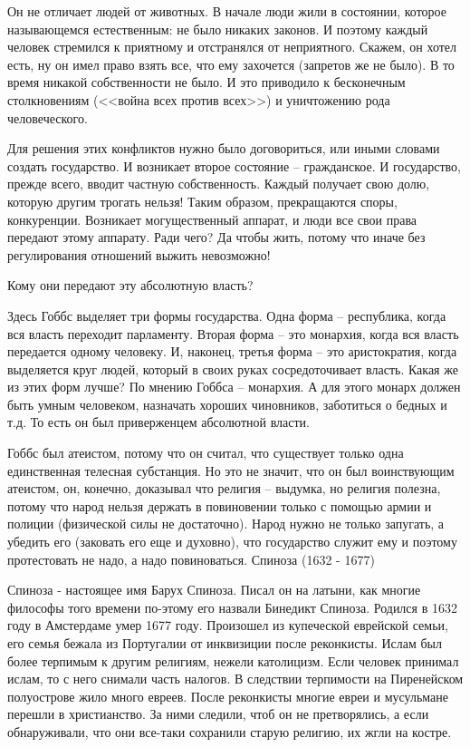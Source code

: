 Он не отличает людей от животных. В начале люди жили в состоянии, которое называющемся естественным: не было никаких законов. И поэтому каждый человек стремился к приятному и отстранялся от неприятного. Скажем, он хотел есть, ну он имел право взять все, что ему захочется (запретов же не было). В то время никакой собственности не было. И это приводило к бесконечным столкновениям (<<война всех против всех>>) и уничтожению рода человеческого.

Для решения этих конфликтов нужно было договориться, или иными словами создать государство. И возникает второе состояние – гражданское. И государство, прежде всего, вводит частную собственность. Каждый получает свою долю, которую другим трогать нельзя! Таким образом, прекращаются споры, конкуренции. Возникает могущественный аппарат, и люди все свои права передают этому аппарату. Ради чего? Да чтобы жить, потому что иначе без регулирования отношений выжить невозможно!

Кому они передают эту абсолютную власть?

    Здесь Гоббс выделяет три формы государства. Одна форма – республика, когда вся власть переходит парламенту. Вторая форма – это монархия, когда вся власть передается одному человеку. И, наконец, третья форма – это аристократия, когда выделяется круг людей, который в своих руках сосредоточивает власть. Какая же из этих форм лучше? По мнению Гоббса – монархия. А для этого монарх должен быть умным человеком, назначать хороших чиновников, заботиться о бедных и т.д. То есть он был приверженцем абсолютной власти.

Гоббс был атеистом, потому что он считал, что существует только одна единственная телесная субстанция. Но это не значит, что он был воинствующим атеистом, он, конечно, доказывал что религия – выдумка, но религия полезна, потому что народ нельзя держать в повиновении только с помощью армии и полиции (физической силы не достаточно). Народ нужно не только запугать, а убедить его (заковать его еще и духовно), что государство служит ему и поэтому протестовать не надо, а надо повиноваться.
Спиноза (1632 - 1677)

Спиноза - настоящее имя Барух Спиноза. Писал он на латыни, как многие философы того времени по-этому его назвали Бинедикт Спиноза. Родился в 1632 году в Амстердаме умер 1677 году. Произошел из купеческой еврейской семьи, его семья бежала из Португалии от инквизиции после реконкисты. Ислам был более терпимым к другим религиям, нежели католицизм. Если человек принимал ислам, то с него снимали часть налогов. В следствии терпимости на Пиренейском полуострове жило много евреев. После реконкисты многие евреи и мусульмане перешли в христианство. За ними следили, чтоб он не претворялись, а если обнаруживали, что они все-таки сохранили старую религию, их жгли на костре.

